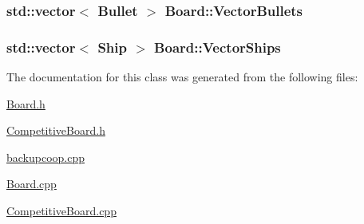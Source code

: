 \hypertarget{classBoard_a2dc362255acf464278a688d03c7d0756}{
\subsubsection[{Vector\-Bullets}]{\setlength{\rightskip}{0pt plus 5cm}std\-::vector$<$ {\bf Bullet} $>$ Board\-::\-Vector\-Bullets\hspace{0.3cm}{\ttfamily [private]}}}\label{classBoard_a2dc362255acf464278a688d03c7d0756}
\hypertarget{classBoard_a18dfdb96f49cf35d7bd480b22ca232b4}{
\subsubsection[{Vector\-Ships}]{\setlength{\rightskip}{0pt plus 5cm}std\-::vector$<$ {\bf Ship} $>$ Board\-::\-Vector\-Ships\hspace{0.3cm}{\ttfamily [private]}}}\label{classBoard_a18dfdb96f49cf35d7bd480b22ca232b4}


The documentation for this class was generated from the following files\-:\begin{DoxyCompactItemize}
\item 
\hyperlink{Board_8h}{Board.\-h}\item 
\hyperlink{CompetitiveBoard_8h}{Competitive\-Board.\-h}\item 
\hyperlink{backupcoop_8cpp}{backupcoop.\-cpp}\item 
\hyperlink{Board_8cpp}{Board.\-cpp}\item 
\hyperlink{CompetitiveBoard_8cpp}{Competitive\-Board.\-cpp}\end{DoxyCompactItemize}
